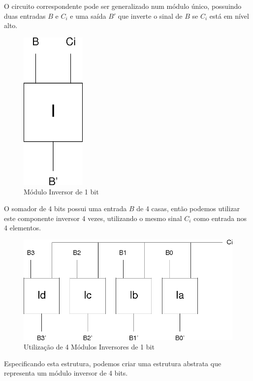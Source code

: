 \documentclass{article}
\begin{document}
O circuito correspondente pode ser generalizado num módulo único, possuindo duas
entradas $B$ e $C_i$ e uma saída $B'$ que inverte o sinal de $B$ se $C_i$ está
em nível alto.

\begin{figure}
    \centering{}
    \includegraphics[scale=0.4]{sources/i.png}
    \caption{Módulo Inversor de 1 bit}
    \label{fig:i}
\end{figure}

O somador de 4 bits possui uma entrada $B$ de 4 casas, então podemos utilizar
este componente inversor 4 vezes, utilizando o mesmo sinal $C_i$ como entrada
nos 4 elementos.

\begin{figure}
    \centering{}
    \includegraphics[scale=0.4]{sources/is.png}
    \caption{Utilização de 4 Módulos Inversores de 1 bit}
    \label{fig:is}
\end{figure}

Especificando esta estrutura, podemos criar uma estrutura abstrata que
representa um módulo inversor de 4 bits.
\end{document}
